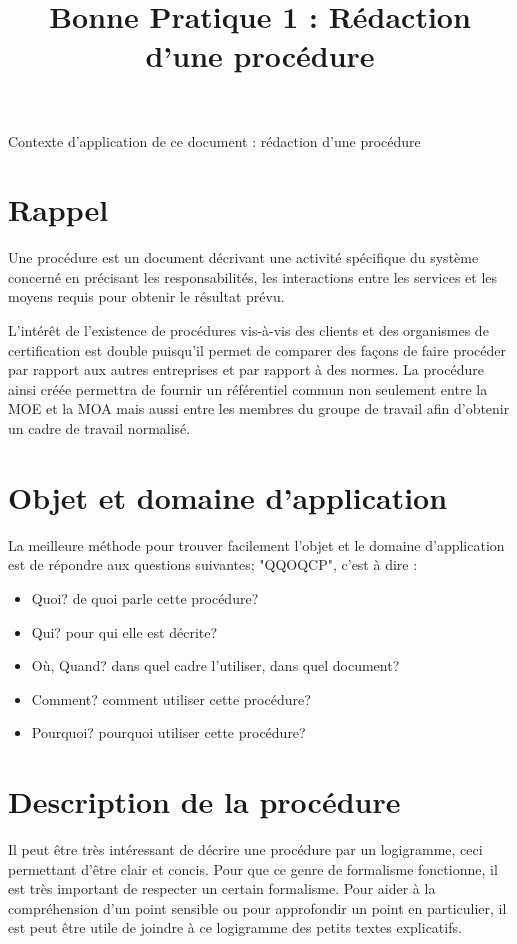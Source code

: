 \documentclass[a4paper]{article}
\begin{document}
\title{Bonne Pratique 1 : Rédaction d'une procédure}
\maketitle

Contexte d'application de ce document : rédaction d'une procédure

\section{Rappel}

Une procédure est un document décrivant une activité spécifique du système concerné en précisant les responsabilités, les interactions entre les services et les moyens requis pour obtenir le résultat prévu.

L'intérêt de l'existence de procédures vis-à-vis des clients et des organismes de certification est double puisqu'il permet de comparer des façons de faire procéder par rapport aux autres entreprises et par rapport à des normes. La procédure ainsi créée permettra de fournir un référentiel commun non seulement entre la MOE et la MOA mais aussi entre les membres du groupe de travail afin d'obtenir un cadre de travail normalisé.

\section{Objet et domaine d'application}

La meilleure méthode pour trouver facilement l'objet et le domaine d'application est de répondre aux questions suivantes; "QQOQCP", c'est à dire :

\begin{itemize}
\item Quoi? de quoi parle cette procédure?
\item Qui? pour qui elle est décrite?
\item Où, Quand? dans quel cadre l'utiliser, dans quel document?
\item Comment? comment utiliser cette procédure?
\item Pourquoi? pourquoi utiliser cette procédure?
\end{itemize}

\section{Description de la procédure}

Il peut être très intéressant de décrire une procédure par un logigramme, ceci permettant d'être clair et concis. Pour que ce genre de formalisme fonctionne, il est très important de respecter un certain formalisme. Pour aider à la compréhension d'un point sensible ou pour approfondir un point en particulier, il est peut être utile de joindre à ce logigramme des petits textes explicatifs.
\end{document}
